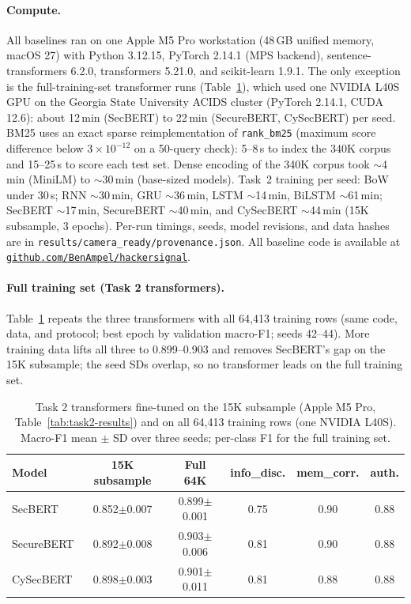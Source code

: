 \documentclass{article}
\begin{document}
\paragraph{Compute.}
All baselines ran on one Apple M5 Pro workstation (48\,GB unified memory, macOS 27) with Python 3.12.15, PyTorch 2.14.1 (MPS backend), sentence-transformers 6.2.0, transformers 5.21.0, and scikit-learn 1.9.1. The only exception is the full-training-set transformer runs (Table~\ref{tab:task2-full}), which used one NVIDIA L40S GPU on the Georgia State University ACIDS cluster (PyTorch 2.14.1, CUDA 12.6): about 12\,min (SecBERT) to 22\,min (SecureBERT, CySecBERT) per seed. BM25 uses an exact sparse reimplementation of \texttt{rank\_bm25} (maximum score difference below $3{\times}10^{-12}$ on a 50-query check): 5--8\,s to index the 340K corpus and 15--25\,s to score each test set. Dense encoding of the 340K corpus took ${\sim}$4\,min (MiniLM) to ${\sim}$30\,min (base-sized models). Task~2 training per seed: BoW under 30\,s; RNN ${\sim}$30\,min, GRU ${\sim}$36\,min, LSTM ${\sim}$14\,min, BiLSTM ${\sim}$61\,min; SecBERT ${\sim}$17\,min, SecureBERT ${\sim}$40\,min, and CySecBERT ${\sim}$44\,min (15K subsample, 3 epochs). Per-run timings, seeds, model revisions, and data hashes are in \texttt{results/camera\_ready/provenance.json}. All baseline code is available at \href{https://github.com/BenAmpel/hackersignal}{\texttt{github.com/BenAmpel/hackersignal}}.

\paragraph{Full training set (Task 2 transformers).}
Table~\ref{tab:task2-full} repeats the three transformers with all 64,413 training rows (same code, data, and protocol; best epoch by validation macro-F1; seeds 42--44). More training data lifts all three to 0.899--0.903 and removes SecBERT's gap on the 15K subsample; the seed SDs overlap, so no transformer leads on the full training set.

\begin{table}[ht]
\centering
\small
\setlength{\tabcolsep}{4pt}
\caption{Task 2 transformers fine-tuned on the 15K subsample (Apple M5 Pro, Table~\ref{tab:task2-results}) and on all 64,413 training rows (one NVIDIA L40S). Macro-F1 mean $\pm$ SD over three seeds; per-class F1 for the full training set.}
\label{tab:task2-full}
\begin{tabular}{lccccc}
\toprule
\textbf{Model} & \textbf{15K subsample} & \textbf{Full 64K} & \textbf{info\_disc.} & \textbf{mem\_corr.} & \textbf{auth.} \\
\midrule
SecBERT & 0.852{\scriptsize$\pm$0.007} & 0.899{\scriptsize$\pm$0.001} & 0.75 & 0.90 & 0.88 \\
SecureBERT & 0.892{\scriptsize$\pm$0.008} & 0.903{\scriptsize$\pm$0.006} & 0.81 & 0.90 & 0.88 \\
CySecBERT & 0.898{\scriptsize$\pm$0.003} & 0.901{\scriptsize$\pm$0.011} & 0.81 & 0.88 & 0.88 \\
\bottomrule
\end{tabular}
\end{table}
\end{document}
